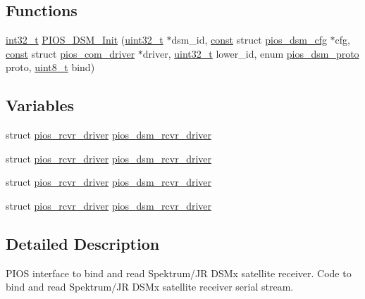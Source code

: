 \subsection*{Functions}
\begin{DoxyCompactItemize}
\item 
\hyperlink{group___n_a_m_e_gafd12020da5a235dfcf0c3c748fb5baed}{int32\-\_\-t} \hyperlink{group___p_i_o_s___d_s_m_ga546d34996bb1c4dd734a5a90da3fab42}{P\-I\-O\-S\-\_\-\-D\-S\-M\-\_\-\-Init} (\hyperlink{stdint_8h_a435d1572bf3f880d55459d9805097f62}{uint32\-\_\-t} $\ast$dsm\-\_\-id, \hyperlink{group___n_a_m_e_ga7ae6d0e43244213b34de2c2b9aa30da6}{const} struct \hyperlink{structpios__dsm__cfg}{pios\-\_\-dsm\-\_\-cfg} $\ast$cfg, \hyperlink{group___n_a_m_e_ga7ae6d0e43244213b34de2c2b9aa30da6}{const} struct \hyperlink{structpios__com__driver}{pios\-\_\-com\-\_\-driver} $\ast$driver, \hyperlink{stdint_8h_a435d1572bf3f880d55459d9805097f62}{uint32\-\_\-t} lower\-\_\-id, enum \hyperlink{group___p_i_o_s___d_s_m_ga0c64890f0b9cb4fd7681b2d92fad8bd9}{pios\-\_\-dsm\-\_\-proto} proto, \hyperlink{stdint_8h_aba7bc1797add20fe3efdf37ced1182c5}{uint8\-\_\-t} bind)
\end{DoxyCompactItemize}
\subsection*{Variables}
\begin{DoxyCompactItemize}
\item 
struct \hyperlink{structpios__rcvr__driver}{pios\-\_\-rcvr\-\_\-driver} \hyperlink{group___p_i_o_s___d_s_m_ga2bfdf466752a6865225de7d8136958b7}{pios\-\_\-dsm\-\_\-rcvr\-\_\-driver}
\item 
struct \hyperlink{structpios__rcvr__driver}{pios\-\_\-rcvr\-\_\-driver} \hyperlink{group___p_i_o_s___d_s_m_ga2bfdf466752a6865225de7d8136958b7}{pios\-\_\-dsm\-\_\-rcvr\-\_\-driver}
\item 
struct \hyperlink{structpios__rcvr__driver}{pios\-\_\-rcvr\-\_\-driver} \hyperlink{group___p_i_o_s___d_s_m_ga2bfdf466752a6865225de7d8136958b7}{pios\-\_\-dsm\-\_\-rcvr\-\_\-driver}
\item 
struct \hyperlink{structpios__rcvr__driver}{pios\-\_\-rcvr\-\_\-driver} \hyperlink{group___p_i_o_s___d_s_m_ga2bfdf466752a6865225de7d8136958b7}{pios\-\_\-dsm\-\_\-rcvr\-\_\-driver}
\end{DoxyCompactItemize}


\subsection{Detailed Description}
P\-I\-O\-S interface to bind and read Spektrum/\-J\-R D\-S\-Mx satellite receiver. Code to bind and read Spektrum/\-J\-R D\-S\-Mx satellite receiver serial stream.

